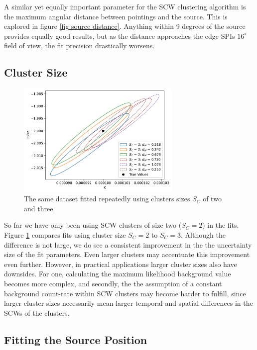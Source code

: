 \documentclass{report}
\begin{document}
A similar yet equally important parameter for the SCW clustering algorithm is the maximum angular distance between pointings and the source. This is explored in figure \ref{fig source distance}. Anything within 9 degrees of the source provides equally good results, but as the distance approaches the edge SPIs $16^\circ$ field of view, the fit precision drastically worsens. 

\FloatBarrier


\subsection{Cluster Size}

\begin{figure}[h]
  \centering
  \includegraphics[width=0.7\textwidth]{Images/Pure_Simulation/combined_plots_cluster_size.pdf}
  \caption{The same dataset fitted repeatedly using clusters sizes $S_C$ of two and three.}
  \label{fig cluster size}
\end{figure}

So far we have only been using SCW clusters of size two ($S_C=2$) in the fits. Figure \ref{fig cluster size} compares fits using cluster size $S_C=2$ to $S_C=3$. Although the difference is not large, we do see a consistent improvement in the the uncertainty size of the fit parameters. Even larger clusters may accentuate this improvement even further. However, in practical applications larger cluster sizes also have downsides. For one, calculating the maximum likelihood background value becomes more complex, and secondly, the the assumption of a constant background count-rate within SCW clusters may become harder to fulfill, since larger cluster sizes necessarily mean larger temporal and spatial differences in the SCWs of the clusters.


\subsection{Fitting the Source Position}
\end{document}
